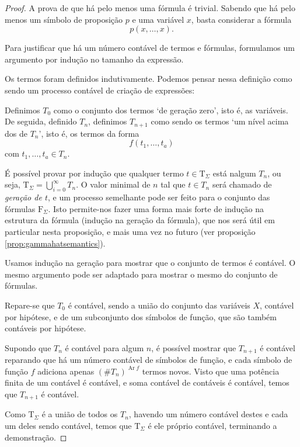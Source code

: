 \documentclass{report}
\theoremstyle{definition}
\theoremstyle{remark}
\newcommand{\F}{\mathrm{F}}
\newcommand{\T}{\mathrm{T}}
\DeclareMathOperator{\ar}{Ar}
\begin{document}
	\begin{proof}
	A prova de que há pelo menos uma fórmula é trivial. Sabendo que há pelo menos um símbolo de proposição $p$ e uma variável $x$, basta considerar a fórmula
	\[p(x, \dots, x).\]
	
	Para justificar que há um número contável de termos e fórmulas, formulamos um argumento por indução no tamanho da expressão.
	
	Os termos foram definidos indutivamente. Podemos pensar nessa definição como sendo um processo contável de criação de expressões:
	
	Definimos $T_0$ como o conjunto dos termos `de geração zero', isto é, as variáveis. De seguida, definido $T_n$, definimos $T_{n+1}$ como sendo os termos `um nível acima dos de $T_n$', isto é, os termos da forma
	\[f(t_1, \dots, t_a)\]
	com $t_1, \dots, t_a \in T_n$.
	
	É possível provar por indução que qualquer termo $t \in \T_\Sigma$ está nalgum $T_n$, ou seja, $\T_\Sigma = \bigcup_{i = 0}^\infty T_n$. O valor minimal de $n$ tal que $t \in T_n$ será chamado de \emph{geração de $t$}, e um processo semelhante pode ser feito para o conjunto das fórmulas $\F_\Sigma$. Isto permite-nos fazer uma forma mais forte de indução na estrutura da fórmula (indução na geração da fórmula), que nos será útil em particular nesta proposição, e mais uma vez no futuro (ver proposição \ref{prop:gammahatsemantics}).
	
	Usamos indução na geração para mostrar que o conjunto de termos é contável. O mesmo argumento pode ser adaptado para mostrar o mesmo do conjunto de fórmulas.
	
	Repare-se que $T_0$ é contável, sendo a união do conjunto das variáveis $X$, contável por hipótese, e de um subconjunto dos símbolos de função, que são também contáveis por hipótese.
	
	Supondo que $T_n$ é contável para algum $n$, é possível mostrar que $T_{n+1}$ é contável reparando que há um número contável de símbolos de função, e cada símbolo de função $f$ adiciona apenas $(\# T_n)^{\ar f}$ termos novos. Visto que uma potência finita de um contável é contável, e soma contável de contáveis é contável, temos que $T_{n+1}$ é contável.
	
	Como $\T_\Sigma$ é a união de todos os $T_n$, havendo um número contável destes e cada um deles sendo contável, temos que $\T_\Sigma$ é ele próprio contável, terminando a demonstração.
	\end{proof}
	
\end{document}
